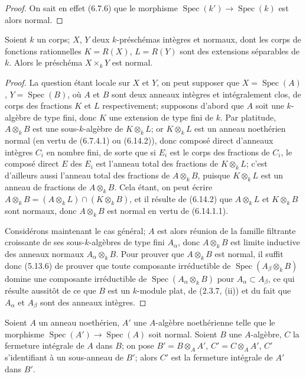 \begin{proof}
On sait en effet (6.7.6) que le morphisme
$\operatorname{Spec}(k')\to\operatorname{Spec}(k)$ est alors normal.
\end{proof}

\begin{corollary}[6.14.3]
\label{IV.2.s6.14.3-fr}
Soient $k$ un corps; $X$, $Y$ deux $k$-préschémas intègres et normaux, dont
les corps de fonctions rationnelles $K=R(X)$, $L=R(Y)$ sont des extensions
séparables de $k$. Alors le préschéma $X\times_k Y$ est normal.
\end{corollary}

\begin{proof}
La question étant locale sur $X$ et $Y$, on peut supposer que
$X=\operatorname{Spec}(A)$, $Y=\operatorname{Spec}(B)$, où $A$ et $B$ sont
deux anneaux intègres et intégralement clos, de corps des fractions $K$ et
$L$ respectivement; supposons d'abord que $A$ soit une $k$-algèbre de type
fini, donc $K$ une extension de type fini de $k$. Par platitude,
$A\otimes_k B$ est une sous-$k$-algèbre de $K\otimes_k L$; or
$K\otimes_k L$ est un anneau noethérien normal (en vertu de (6.7.4.1) ou
(6.14.2)), donc composé direct d'anneaux intègres $C_i$ en nombre fini, de
sorte que si $E_i$ est le corps des fractions de $C_i$, le composé direct
$E$ des $E_i$ est l'anneau total des fractions de $K\otimes_k L$; c'est
d'ailleurs aussi l'anneau total des fractions de $A\otimes_k B$, puisque
$K\otimes_k L$ est un anneau de fractions de $A\otimes_k B$. Cela étant,
on peut écrire
$A\otimes_k B=(A\otimes_k L)\cap(K\otimes_k B)$, et il résulte de (6.14.2)
que $A\otimes_k L$ et $K\otimes_k B$ sont normaux, donc $A\otimes_k B$ est
normal en vertu de (6.14.1.1).

Considérons maintenant le cas général; $A$ est alors réunion de la famille
filtrante croissante de ses sous-$k$-algèbres de type fini $A_\alpha$,
donc $A\otimes_k B$ est limite inductive des anneaux normaux
$A_\alpha\otimes_k B$. Pour prouver que $A\otimes_k B$ est normal, il
suffit donc (5.13.6) de prouver que toute composante irréductible de
$\operatorname{Spec}(A_\beta\otimes_k B)$ domine une composante
irréductible de $\operatorname{Spec}(A_\alpha\otimes_k B)$ pour
$A_\alpha\subset A_\beta$, ce qui résulte aussitôt de ce que $B$ est un
$k$-module plat, de (2.3.7, (ii)) et du fait que $A_\alpha$ et $A_\beta$
sont des anneaux intègres.
\end{proof}

\begin{proposition}[6.14.4]
\label{IV.2.s6.14.4-fr}
Soient $A$ un anneau noethérien, $A'$ une $A$-algèbre noethérienne telle
que le morphisme $\operatorname{Spec}(A')\to\operatorname{Spec}(A)$ soit
normal. Soient $B$ une $A$-algèbre, $C$ la fermeture intégrale de $A$ dans
$B$; on pose $B'=B\otimes_A A'$, $C'=C\otimes_A A'$, $C'$ s'identifiant à
un sous-anneau de $B'$; alors $C'$ est la fermeture intégrale de $A'$ dans
$B'$.
\end{proposition}

